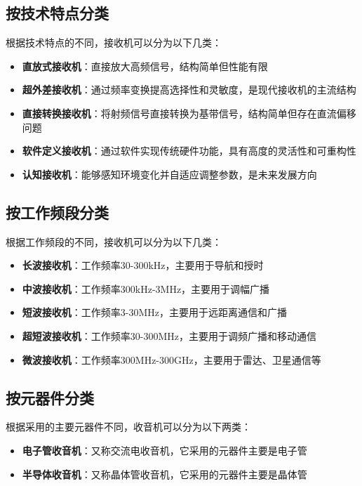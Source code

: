 \documentclass[12pt,UTF8]{ctexbook}
\begin{document}
\subsection{按技术特点分类}

根据技术特点的不同，接收机可以分为以下几类：

\begin{itemize}[leftmargin=3.5em]
    \item \textbf{直放式接收机}：直接放大高频信号，结构简单但性能有限
    \item \textbf{超外差接收机}：通过频率变换提高选择性和灵敏度，是现代接收机的主流结构
    \item \textbf{直接转换接收机}：将射频信号直接转换为基带信号，结构简单但存在直流偏移问题
    \item \textbf{软件定义接收机}：通过软件实现传统硬件功能，具有高度的灵活性和可重构性
    \item \textbf{认知接收机}：能够感知环境变化并自适应调整参数，是未来发展方向
\end{itemize}

\subsection{按工作频段分类}

根据工作频段的不同，接收机可以分为以下几类：

\begin{itemize}[leftmargin=3.5em]
    \item \textbf{长波接收机}：工作频率30-300kHz，主要用于导航和授时
    \item \textbf{中波接收机}：工作频率300kHz-3MHz，主要用于调幅广播
    \item \textbf{短波接收机}：工作频率3-30MHz，主要用于远距离通信和广播
    \item \textbf{超短波接收机}：工作频率30-300MHz，主要用于调频广播和移动通信
    \item \textbf{微波接收机}：工作频率300MHz-300GHz，主要用于雷达、卫星通信等
\end{itemize}

\subsection{按元器件分类}

根据采用的主要元器件不同，收音机可以分为以下两类：

\begin{itemize}[leftmargin=3.5em]
    \item \textbf{电子管收音机}：又称交流电收音机，它采用的元器件主要是电子管
    \item \textbf{半导体收音机}：又称晶体管收音机，它采用的元器件主要是晶体管
\end{itemize}
\end{document}
